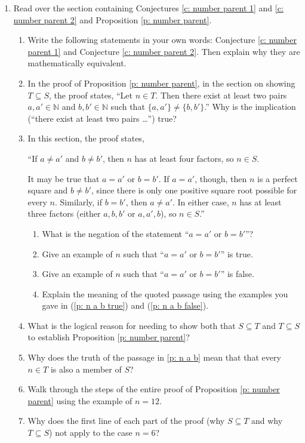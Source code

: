 \documentclass[11pt]{article}
\newcommand{\N}{\mathbb{N}}
\renewcommand\subset\subseteq
\theoremstyle{definition}
\begin{document}
\begin{enumerate}
\item %

Read over the section containing Conjectures \ref{c: number parent 1} and \ref{c: number parent 2} and Proposition \ref{p: number parent}.  
	\begin{enumerate}
	\item 	
		Write the following statements in your own words: Conjecture \ref{c: number parent 1} and Conjecture \ref{c: number parent 2}. Then explain why they are mathematically equivalent.
	\item \label{p: n a b} In the proof of Proposition \ref{p: number parent}, in the section on showing $T\subset S$, the proof states, ``Let $n\in T.$ Then there exist at least two pairs $a,a'\in \N$ and $b, b'\in \N$ such that $\{a,a'\}\neq \{b, b'\}$.'' Why is the implication (``there exist at least two pairs \dots'') true? 
	\item  In this section, the proof states, 
	
	``If $a\neq a'$ and $b\neq b'$, then $n$ has at least four factors, so $n\in S$. 
	
	It may be true that $a=a'$ or $b=b'$. If $a=a'$, though, then $n$ is a perfect square and $b\neq b'$, since there is only one positive square root possible for every $n$. Similarly, if $b=b'$, then $a\neq a'$. In either case, $n$ has at least three factors (either $a, b, b'$ or $a, a', b$), so $n\in S$.''
	
		\begin{enumerate}
		\item What is the negation of the statement ``$a=a'$ or $b=b'$''?
		\item \label{p: n a b true} Give an example of $n$ such that ``$a=a'$ or $b=b'$'' is true. 
		\item \label{p: n a b false} Give an example of $n$ such that ``$a=a'$ or $b=b'$'' is false. 
		\item Explain the meaning of the quoted passage using the examples you gave in (\ref{p: n a b true}) and (\ref{p: n a b false}).
		\end{enumerate}
	\item What is the logical reason for needing to show both that  $S\subset T$ and $T\subset S$ to establish Proposition \ref{p: number parent}?
	\item Why does the truth of the passage in \ref{p: n a b} mean that that every $n\in T$ is also a member of $S$? 
	\item Walk through the steps of the entire proof of Proposition \ref{p: number parent} using the example of $n=12$.
	\item Why does the first line of each part of the proof (why $S\subset T$ and why $T\subset S$) not apply to the case $n=6$?
	\end{enumerate}


\end{enumerate}
\end{document}

